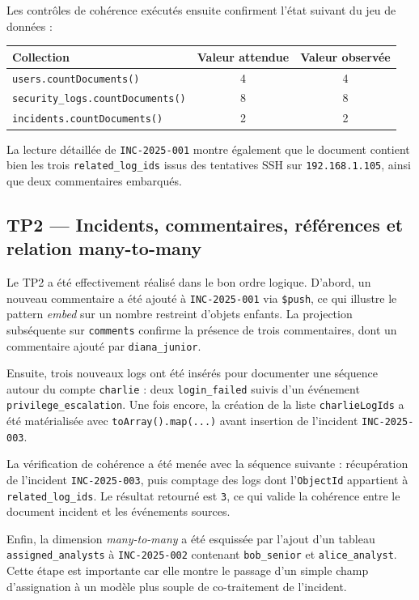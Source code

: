 \documentclass[11pt,a4paper]{article}
\begin{document}
Les contrôles de cohérence exécutés ensuite confirment l'état suivant du jeu de données :

\begin{center}
\begin{tabular}{lcc}
\toprule
Collection & Valeur attendue & Valeur observée \\
\midrule
\texttt{users.countDocuments()} & 4 & 4 \\
\texttt{security\_logs.countDocuments()} & 8 & 8 \\
\texttt{incidents.countDocuments()} & 2 & 2 \\
\bottomrule
\end{tabular}
\end{center}

La lecture détaillée de \texttt{INC-2025-001} montre également que le document contient bien les trois \texttt{related\_log\_ids} issus des tentatives SSH sur \texttt{192.168.1.105}, ainsi que deux commentaires embarqués.

\subsection{TP2 --- Incidents, commentaires, références et relation many-to-many}

Le TP2 a été effectivement réalisé dans le bon ordre logique. D'abord, un nouveau commentaire a été ajouté à \texttt{INC-2025-001} via \texttt{\$push}, ce qui illustre le pattern \emph{embed} sur un nombre restreint d'objets enfants. La projection subséquente sur \texttt{comments} confirme la présence de trois commentaires, dont un commentaire ajouté par \texttt{diana\_junior}.

Ensuite, trois nouveaux logs ont été insérés pour documenter une séquence autour du compte \texttt{charlie} : deux \texttt{login\_failed} suivis d'un événement \texttt{privilege\_escalation}. Une fois encore, la création de la liste \texttt{charlieLogIds} a été matérialisée avec \texttt{toArray().map(...)} avant insertion de l'incident \texttt{INC-2025-003}.

La vérification de cohérence a été menée avec la séquence suivante : récupération de l'incident \texttt{INC-2025-003}, puis comptage des logs dont l'\texttt{ObjectId} appartient à \texttt{related\_log\_ids}. Le résultat retourné est \texttt{3}, ce qui valide la cohérence entre le document incident et les événements sources.

Enfin, la dimension \emph{many-to-many} a été esquissée par l'ajout d'un tableau \texttt{assigned\_analysts} à \texttt{INC-2025-002} contenant \texttt{bob\_senior} et \texttt{alice\_analyst}. Cette étape est importante car elle montre le passage d'un simple champ d'assignation à un modèle plus souple de co-traitement de l'incident.
\end{document}
